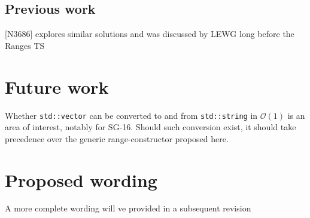 \documentclass{wg21}
\newcommand{\cc}[1]{\texttt{#1}}
\begin{document}
\subsection{Previous work}

[N3686] explores similar solutions and was discussed by LEWG long before the Ranges TS

\section{Future work}

Whether \cc{std::vector} can be converted to and from \cc{std::string} in $\mathcal{O}(1)$ is an area of interest, notably for SG-16.
Should such conversion exist, it should take precedence over the generic range-constructor proposed here.

\section{Proposed wording}

A more complete wording will ve provided in a subsequent revision
\end{document}
